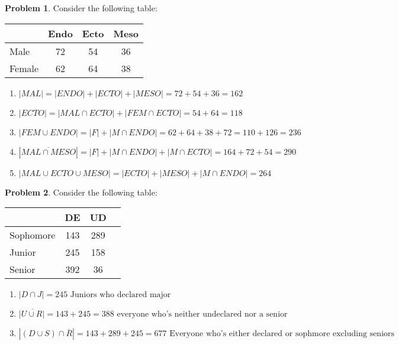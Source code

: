 \documentclass{article}
\theoremstyle{definition}
\newtheorem{problem}{Problem}[section]
\begin{document}
\begin{problem}
    Consider the following table:

    \begin{center}
        \begin{tabular}{lccc}
            \toprule
                      & Endo & Ecto & Meso \\
            \midrule
            Male    & 72   & 54   & 36   \\
            Female  & 62   & 64   & 38   \\
            \bottomrule
        \end{tabular}
    \end{center}

    \begin{enumerate}[label=(\alph*)]
        \item \( |MAL| = |ENDO| + |ECTO| + |MESO| = 72 + 54 + 36 = 162 \)
        \item \( |ECTO| = |MAL \cap ECTO| + |FEM \cap ECTO| = 54 + 64 = 118 \)
        \item \( |FEM \cup ENDO| = |F| + |M \cap ENDO| = 62 + 64 + 38 + 72 = 110 + 126 = 236 \)
        \item \(|\overline{MAL \cap MESO}| = |F| + |M \cap ENDO| + |M \cap ECTO| = 164 + 72 + 54 = 290\)
        \item \(|MAL \cup ECTO \cup MESO| = |ECTO| + |MESO| + |M \cap ENDO| = 264\)
    \end{enumerate}
\end{problem}

\begin{problem}
    Consider the following table:

    \begin{center}
        \begin{tabular}{lccc}
            \toprule
                      & DE & UD \\
            \midrule
            Sophomore    & 143   & 289  \\
            Junior  & 245   & 158   \\
            Senior  & 392   & 36   \\
            \bottomrule
        \end{tabular}
    \end{center}

    \begin{enumerate}[label=(\alph*)]
        \item \(|D \cap J| = 245 \text{  Juniors who declared major}\)
        \item \(|\overline{U \cup R|} = 143 + 245 = 388 \text{ everyone who's neither undeclared nor a senior }\)
        \item \(|(D \cup S ) \cap \overline{R}| = 143 + 289 + 245 = 677 \text{ Everyone who's either declared or
        sophmore excluding seniors}\)
    \end{enumerate}
\end{problem}
\end{document}
